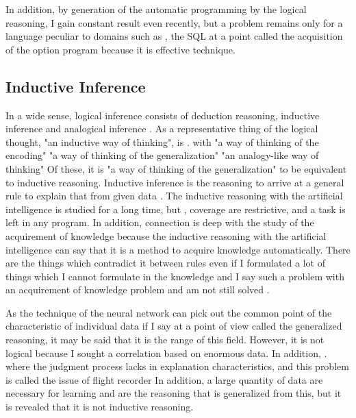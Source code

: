 \documentclass{article}
\begin{document}
In addition, by generation of the automatic programming by the logical reasoning, I gain constant result even recently, but a problem remains only for a language peculiar to domains such as \cite{palsql}, the SQL at a point called the acquisition of the option program because it is effective technique.

\subsection {Inductive Inference}
In a wide sense, logical inference consists of deduction reasoning, inductive inference and analogical inference \cite{math300}.
As a representative thing of the logical thought, "an inductive way of thinking", is \cite{saito:11}. with "a way of thinking of the encoding" "a way of thinking of the generalization" "an analogy-like way of thinking"
Of these, it is "a way of thinking of the generalization" to be equivalent to inductive reasoning.
Inductive inference is the reasoning to arrive at a general rule to explain that from given data \cite {inductive-reasoning}.
The inductive reasoning with the artificial intelligence is studied for a long time, but \cite{CASE1983193}\cite{4767034}, coverage are restrictive, and a task is left in any program.
In addition, connection is deep with the study of the acquirement of knowledge because the inductive reasoning with the artificial intelligence can say that it is a method to acquire knowledge automatically.
There are the things which contradict it between rules even if I formulated a lot of things which I cannot formulate in the knowledge and I say such a problem with an acquirement of knowledge problem and am not still solved \cite{KnowledgeAI}\cite{KAIssues}.

As the technique of the neural network can pick out the common point of the characteristic of individual data if I say at a point of view called the generalized reasoning, it may be said that it is the range of this field.
However, it is not logical because I sought a correlation based on enormous data.
In addition, \cite{BlackBoxProblem}. where the judgment process lacks in explanation characteristics, and this problem is called the issue of flight recorder
In addition, a large quantity of data are necessary for learning and are the reasoning that is generalized from this, but it is revealed that it is not inductive reasoning.
\end{document}
